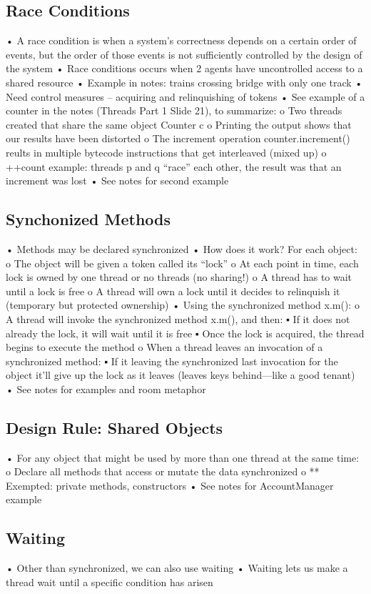 \documentclass[11pt]{article}
\begin{document}
{{\subsection{Race Conditions}
• A race condition is when a system’s correctness depends on a certain order of events, but the
order of those events is not sufficiently controlled by the design of the system
• Race conditions occurs when 2 agents have uncontrolled access to a shared resource
• Example in notes: trains crossing bridge with only one track
• Need control measures – acquiring and relinquishing of tokens
• See example of a counter in the notes (Threads Part 1 Slide 21), to summarize:
o Two threads created that share the same object Counter c
o Printing the output shows that our results have been distorted
o The increment operation counter.increment() reults in multiple bytecode instructions that
get interleaved (mixed up)
o ++count example: threads p and q “race” each other, the result was that an increment was
lost
• See notes for second example
\subsection{Synchonized Methods}
• Methods may be declared synchronized
• How does it work? For each object:
o The object will be given a token called its “lock”
o At each point in time, each lock is owned by one thread or no threads (no sharing!)
o A thread has to wait until a lock is free
o A thread will own a lock until it decides to relinquish it (temporary but protected ownership)
• Using the synchronized method x.m():
o A thread will invoke the synchronized method x.m(), and then:
▪ If it does not already the lock, it will wait until it is free
▪ Once the lock is acquired, the thread begins to execute the method
o When a thread leaves an invocation of a synchronized method:
▪ If it leaving the synchronized last invocation for the object it’ll give up the lock as it
leaves (leaves keys behind—like a good tenant)
• See notes for examples and room metaphor
\subsection{Design Rule: Shared Objects}
• For any object that might be used by more than one thread at the same time:
o Declare all methods that access or mutate the data synchronized
o ** Exempted: private methods, constructors
• See notes for AccountManager example
\subsection{Waiting}
• Other than synchronized, we can also use waiting
• Waiting lets us make a thread wait until a specific condition has arisen
}}
\end{document}
